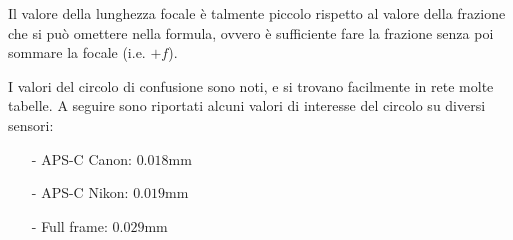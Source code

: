 \nb Il valore della lunghezza focale è talmente piccolo rispetto al valore della frazione che si può omettere nella formula, ovvero è sufficiente fare la frazione senza poi sommare la focale (i.e. $+ f$).

I valori del circolo di confusione sono noti, e si trovano facilmente in rete molte tabelle.
A seguire sono riportati alcuni valori di interesse del circolo su diversi sensori:
\begin{itemize}
    \item[-] APS-C Canon: $0.018$mm
    \item[-] APS-C Nikon: $0.019$mm
    \item[-] Full frame: $0.029$mm
\end{itemize}